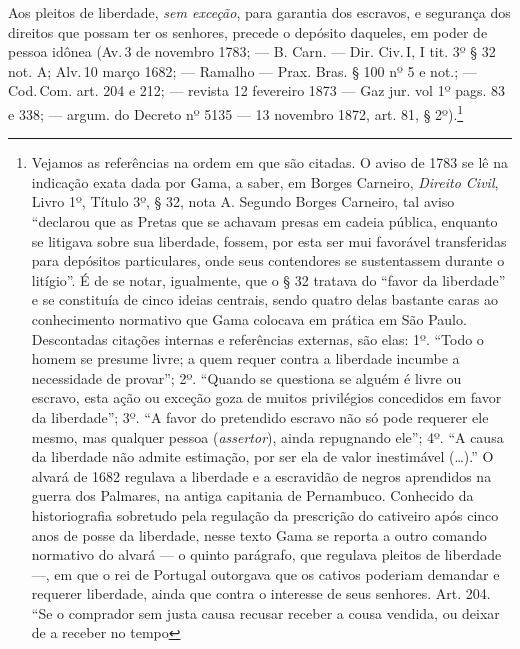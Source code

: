 Aos pleitos de liberdade, \emph{sem exceção}, para garantia dos
escravos, e segurança dos direitos que possam ter os senhores, precede o
depósito daqueles, em poder de pessoa idônea (Av.\,3 de novembro 1783; ---
B. Carn. --- Dir. Civ.\,I, I tit. 3º § 32 not. A; Alv.\,10 março 1682; ---
Ramalho --- Prax. Bras. § 100 nº 5 e not.; --- Cod.\,Com. art. 204 e 212; ---
revista 12 fevereiro 1873 --- Gaz jur. vol 1º pags. 83 e 338; ---
argum. do Decreto nº 5135 --- 13 novembro 1872, art. 81, § 2º).\footnote{
  Vejamos as referências na ordem em que são citadas. O aviso de 1783 se
  lê na indicação exata dada por Gama, a saber, em Borges Carneiro,
  \emph{Direito Civil}, Livro 1º, Título 3º, § 32, nota A. Segundo
  Borges Carneiro, tal aviso ``declarou que as Pretas que se achavam
  presas em cadeia pública, enquanto se litigava sobre sua liberdade,
  fossem, por esta ser mui favorável transferidas para depósitos
  particulares, onde seus contendores se sustentassem durante o
  litígio''. É de se notar, igualmente, que o § 32 tratava do ``favor da
  liberdade'' e se constituía de cinco ideias centrais, sendo quatro
  delas bastante caras ao conhecimento normativo que Gama colocava em
  prática em São Paulo. Descontadas citações internas e referências
  externas, são elas: 1º. ``Todo o homem se presume livre; a quem requer
  contra a liberdade incumbe a necessidade de provar''; 2º.
  ``Quando se questiona se alguém é livre ou escravo, esta ação ou
  exceção goza de muitos privilégios concedidos em favor da liberdade'';
  3º. ``A favor do pretendido escravo não só pode requerer ele mesmo, mas
  qualquer pessoa (\emph{assertor}), ainda repugnando ele''; 4º. ``A causa
  da liberdade não admite estimação, por ser ela de valor inestimável
  (\ldots{}).'' O alvará de 1682 regulava a liberdade e a escravidão de negros
  aprendidos na guerra dos Palmares, na antiga capitania de Pernambuco.
  Conhecido da historiografia sobretudo pela regulação da prescrição do
  cativeiro após cinco anos de posse da liberdade, nesse texto Gama se
  reporta a outro comando normativo do alvará --- o quinto parágrafo, que
  regulava pleitos de liberdade ---, em que o rei de Portugal outorgava que
  os cativos poderiam demandar e requerer liberdade, ainda que contra o
  interesse de seus senhores. Art. 204. ``Se o comprador sem justa causa
  recusar receber a cousa vendida, ou deixar de a receber no tempo
}
